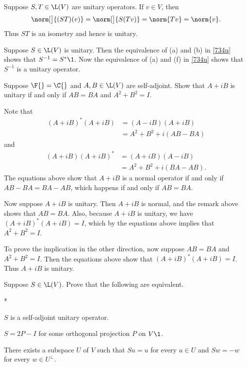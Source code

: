 \begin{Solution}
\begin{subtheorem}
\item
Suppose $S, T \in \L(V)$ are unitary operators. If $v \in V$, then
\[
\norm[\big]{(ST)(v)} = \norm[\big]{ S(Tv) } = \norm{Tv} = \norm{v}.
\]
Thus $ST$ is an isometry and hence is unitary.

\item
Suppose $S \in \L(V)$ is unitary. Then the equivalence of (a) and (b) in \ref{734u} shows that $S^{-1} = S^*\1$. Now the equivalence of (a) and (f) in \ref{734u} shows that $S^{-1}$ is a unitary operator.
\end{subtheorem}
\end{Solution}

\exercise
Suppose $\F{} = \C{}$ and $A, B \in \L(V)$ are self-adjoint. Show that $A + iB$ is unitary if and only if $AB = BA$ and
$A^2 + B^2 = I$.

\begin{Solution}
Note that
\begin{align*}
(A + iB)^* (A + iB) &= (A - iB)(A + iB) \\
&= A^2 + B^2 + i(AB - BA)
\end{align*}
and
\begin{align*}
(A + iB) (A + iB)^* &= (A + iB)(A - iB) \\
&= A^2 + B^2 + i(BA - AB).
\end{align*}
The equations above show that $A + iB$ is a normal operator if and only if $AB - BA = BA - AB$, which happens if and only if
$AB = BA$.

Now suppose $A + iB$ is unitary. Then $A + iB$ is normal, and the remark above shows that $AB = BA$. Also, because $A + iB$ is unitary, we have $(A + iB)^* (A + iB) = I$, which by the equations above implies that $A^2 + B^2 = I$.

To prove the implication in the other direction, now suppose $AB = BA$ and $A^2 + B^2 = I$. Then the equations above show that
$(A + iB)^* (A + iB) = I$. Thus $A + iB$ is unitary.
\end{Solution}

\exercise
Suppose $S \in \L(V)$. Prove that the following are equivalent.
\begin{subtheorem}*
\item
$S$ is a self-adjoint unitary operator.
\item
$S = 2P - I$ for some orthogonal projection $P$ on $V\1$.
\item
There exists a subspace $U$ of $V$ such that $Su = u$ for every $u \in U$ and $Sw = -w$ for every $w \in U^\perp\!$.
\end{subtheorem}
\exercisesubtheoremend

